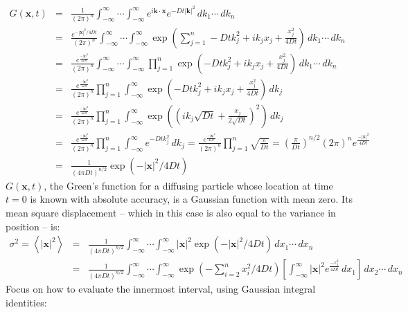 \documentclass{article}
\begin{document}
\begin{eqnarray}
G(\mathbf{x},t) & = & \frac{1}{(2\pi)^n} \int^{\infty}_{-\infty} \cdots \int^{\infty}_{-\infty} e^{i\mathbf{k} \cdot \mathbf{x}}e^{-Dt|\mathbf{k}|^2}\,dk_1 \cdots \,dk_n \nonumber \\
& = & \frac{e^{-|\mathbf{x}|^2/4Dt}}{(2\pi)^n} \int^{\infty}_{-\infty} \cdots \int^{\infty}_{-\infty} \exp\left(\sum_{j=1}^n -Dtk_j^2 + ik_jx_j +  \frac{x_j^2}{4Dt} \right) \,dk_1 \cdots \,dk_n \nonumber \\
& = & \frac{e^{\frac{-|\mathbf{x}|^2}{4Dt}}}{(2\pi)^n} \int^{\infty}_{-\infty} \cdots \int^{\infty}_{-\infty} \prod_{j=1}^n \exp \left(-Dtk_j^2 + ik_jx_j + \frac{x_j^2}{4Dt} \right) \,dk_1 \cdots \,dk_n \nonumber \\
& = & \frac{e^{\frac{-|\mathbf{x}|^2}{4Dt}}}{(2\pi)^n} \prod_{j=1}^n \int^{\infty}_{-\infty} \exp \left(-Dtk_j^2 + ik_jx_j + \frac{x_j^2}{4Dt} \right) \,dk_j \nonumber \\
& = & \frac{e^{\frac{-|\mathbf{x}|^2}{4Dt}}}{(2\pi)^n} \prod_{j=1}^n \int^{\infty}_{-\infty} \exp \left( \left(ik_j\sqrt{Dt} + \frac{x_j}{2\sqrt{Dt}}\right)^2 \right) \,dk_j \nonumber \\
& = & \frac{e^{\frac{-|\mathbf{x}|^2}{4Dt}}}{(2\pi)^n} \prod_{j=1}^n \int^{\infty}_{-\infty} e^{-Dtk_j^2} \,dk_j = \frac{e^{\frac{-|\mathbf{x}|^2}{4Dt}}}{(2\pi)^n} \prod_{j=1}^n \sqrt{\frac{\pi}{Dt}} = \left( \frac{\pi}{Dt} \right)^{n/2}{(2\pi)^n} e^{\frac{-|\mathbf{x}|^2}{4Dt}} \nonumber \\
& = & \frac{1}{\left(4\pi Dt\right)^{n/2}} \exp\left(-|\mathbf{x}|^2/4Dt\right) \nonumber
\end{eqnarray}
$G(\mathbf{x},t)$, the Green's function for a diffusing particle whose location at time $t=0$ is known with absolute accuracy, is a Gaussian function with mean zero. Its mean square displacement -- which in this case is also equal to the variance in position -- is:
\begin{eqnarray*}
\sigma^2 = \left< |\mathbf{x}|^2 \right> & = & \frac{1}{\left(4\pi Dt\right)^{n/2}} \int_{-\infty}^{\infty} \cdots \int_{-\infty}^{\infty} |\mathbf{x}|^2 \exp\left(-|\mathbf{x}|^2/4Dt\right) \,dx_1 \cdots \,dx_n \\
& = & \frac{1}{\left(4\pi Dt\right)^{n/2}} \int_{-\infty}^{\infty} \cdots  \int_{-\infty}^{\infty} \exp\left(- \sum_{i=2}^{n} x_i^2/4Dt\right) \left[ \int_{-\infty}^{\infty} |\mathbf{x}|^2 e^{\frac{-x_1^2}{4Dt}} \,dx_1 \right]\, dx_2 \cdots \,dx_n
\end{eqnarray*}
Focus on how to evaluate the innermost interval, using Gaussian integral identities:
\end{document}
